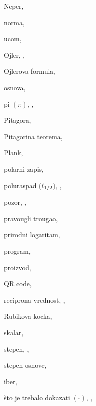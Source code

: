 \begin{theindex}
  \indexspace

  \item Neper, 
  \item norma, 

  \indexspace

  \item {\Nj}ucom, 

  \indexspace

  \item Ojler, , 
  \item Ojlerova formula, 
  \item osnova, 

  \indexspace

  \item pi $(\pi)$, , 
  \item Pitagora, 
  \item Pitagorina teorema, 
  \item Plank, 
  \item polarni zapis, 
  \item poluraspad ($t_{1/2}$), , 
  \item pozor, , 
  \item pravougli trougao, 
  \item prirodni logaritam, 
  \item program, 
  \item proizvod, 

  \indexspace

  \item QR code, 

  \indexspace

  \item recipro{\cv}na vrednost, , 
  \item Rubikova kocka, 

  \indexspace

  \item skalar, 
  \item stepen, , 
  \item stepen osnove, 

  \indexspace

  \item {\sv}iber, 
  \item {{\v s}}to je trebalo dokazati $(\square )$, , 


\end{theindex}
